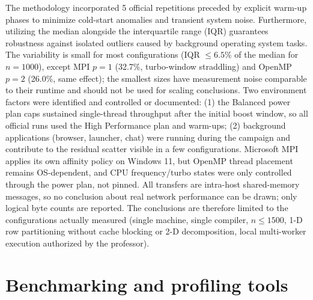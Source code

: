 \documentclass[12pt,a4paper]{article}
\begin{document}
The methodology incorporated 5 official repetitions preceded by explicit
warm-up phases to minimize cold-start anomalies and transient system noise.
Furthermore, utilizing the median alongside the interquartile range (IQR)
guarantees robustness against isolated outliers caused by background
operating system tasks. The variability is small for most configurations
(IQR $\leq 6.5\%$ of the median for $n = 1000$), except MPI $p = 1$
(32.7\%, turbo-window straddling) and OpenMP $p = 2$ (26.0\%, same effect);
the smallest sizes have measurement noise comparable to their runtime and
should not be used for scaling conclusions. Two environment factors were
identified and controlled or documented: (1) the Balanced power plan caps
sustained single-thread throughput after the initial boost window, so all
official runs used the High Performance plan and warm-ups; (2) background
applications (browser, launcher, chat) were running during the campaign and
contribute to the residual scatter visible in a few configurations. Microsoft
MPI applies its own affinity policy on Windows 11, but OpenMP thread
placement remains OS-dependent, and CPU frequency/turbo states were only
controlled through the power plan, not pinned. All transfers are intra-host
shared-memory messages, so no conclusion about real network performance can
be drawn; only logical byte counts are reported. The conclusions are
therefore limited to the configurations actually measured (single machine,
single compiler, $n \leq 1500$, 1-D row partitioning without cache blocking
or 2-D decomposition, local multi-worker execution authorized by the
professor).

\section{Benchmarking and profiling tools}
\label{sec:tools}
\end{document}

